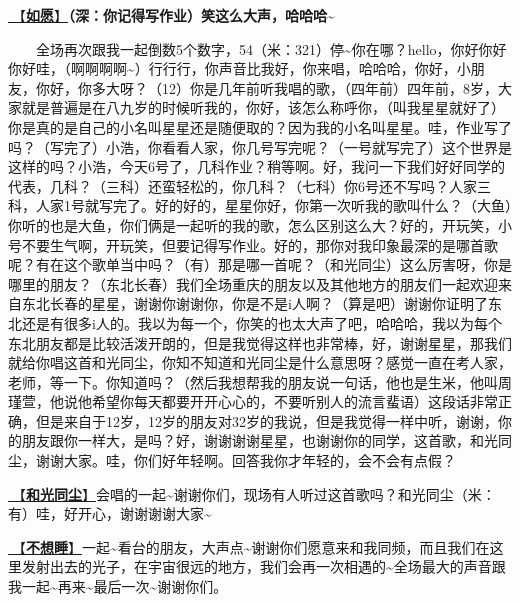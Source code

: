 \documentclass[]{ctexbook}
\begin{document}
\hyperref[achieve-wishes]{🎵【\textbf{如愿}】}\textbf{（深：你记得写作业）笑这么大声，哈哈哈\textasciitilde{}}

  全场再次跟我一起倒数5个数字，54（米：321）停\textasciitilde 你在哪？hello，你好你好你好哇，（啊啊啊啊\textasciitilde）行行行，你声音比我好，你来唱，哈哈哈，你好，小朋友，你好，你多大呀？（12）你是几年前听我唱的歌，（四年前）四年前，8岁，大家就是普遍是在八九岁的时候听我的，你好，该怎么称呼你，（叫我星星就好了）你是真的是自己的小名叫星星还是随便取的？因为我的小名叫星星。哇，作业写了吗？（写完了）小浩，你看看人家，你几号写完呢？（一号就写完了）这个世界是这样的吗？小浩，今天6号了，几科作业？稍等啊。好，我问一下我们好好同学的代表，几科？（三科）还蛮轻松的，你几科？（七科）你6号还不写吗？人家三科，人家1号就写完了。好的好的，星星你好，你第一次听我的歌叫什么？（大鱼）你听的也是大鱼，你们俩是一起听的我的歌，怎么区别这么大？好的，开玩笑，小号不要生气啊，开玩笑，但要记得写作业。好的，那你对我印象最深的是哪首歌呢？有在这个歌单当中吗？（有）那是哪一首呢？（和光同尘）这么厉害呀，你是哪里的朋友？（东北长春）我们全场重庆的朋友以及其他地方的朋友们一起欢迎来自东北长春的星星，谢谢你谢谢你，你是不是i人啊？（算是吧）谢谢你证明了东北还是有很多i人的。我以为每一个，你笑的也太大声了吧，哈哈哈，我以为每个东北朋友都是比较活泼开朗的，但是我觉得这样也非常棒，好，谢谢星星，那我们就给你唱这首和光同尘，你知不知道和光同尘是什么意思呀？感觉一直在考人家，老师，等一下。你知道吗？（然后我想帮我的朋友说一句话，他也是生米，他叫周瑾萱，他说他希望你每天都要开开心心的，不要听别人的流言蜚语）这段话非常正确，但是来自于12岁，12岁的朋友对32岁的我说，但是我觉得一样中听，谢谢，你的朋友跟你一样大，是吗？好，谢谢谢谢星星，也谢谢你的同学，这首歌，和光同尘，谢谢大家。哇，你们好年轻啊。回答我你才年轻的，会不会有点假？

\hyperref[stay-with-light]{🎵【\textbf{和光同尘}】}会唱的一起\textasciitilde 谢谢你们，现场有人听过这首歌吗？和光同尘（米：有）哇，好开心，谢谢谢谢大家\textasciitilde{}

\hyperref[keep-playing]{🎵【\textbf{不想睡}】}一起\textasciitilde 看台的朋友，大声点\textasciitilde 谢谢你们愿意来和我同频，而且我们在这里发射出去的光子，在宇宙很远的地方，我们会再一次相遇的\textasciitilde 全场最大的声音跟我一起\textasciitilde 再来\textasciitilde 最后一次\textasciitilde 谢谢你们。
\end{document}
